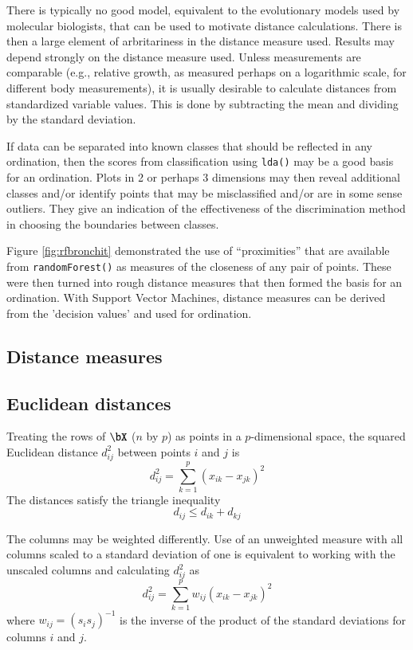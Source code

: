 \documentclass{tufte-book}\usepackage[]{graphicx}\usepackage[]{color}
\newcommand{\txtt}[1]{\texttt{#1}}
\begin{document}
There is typically no good model, equivalent
to the evolutionary models used by molecular biologists, that can be
used to motivate distance calculations.  There is then a large element
of arbritariness in the distance measure used.
Results may depend strongly on the distance measure used.  Unless
measurements are comparable (e.g., relative growth, as measured
perhaps on a logarithmic scale, for different body measurements), it
is usually desirable to calculate distances from standardized variable
values.  This is done by subtracting the mean and dividing by the
standard deviation.

If data can be separated into known classes that should be reflected
in any ordination, then the scores from classification using
\txtt{lda()} may be a good basis for an ordination. Plots in 2 or
perhaps 3 dimensions may then reveal additional classes and/or
identify points that may be misclassified and/or are in some sense
outliers.  They give an indication of the effectiveness of the
discrimination method in choosing the boundaries between classes.

Figure \ref{fig:rfbronchit} demonstrated the use of ``proximities''
that are available from \txtt{randomForest()} as measures of the
closeness of any pair of points.  These were then turned into rough
distance measures that then formed the basis for an ordination.  With
Support Vector Machines, distance measures can be derived from the
'decision values' and used for ordination.

\subsection{Distance measures}

\subsection*{Euclidean distances}

Treating the rows of $\bX$ ($n$ by $p$) as points in a $p$-dimensional
space, the squared Euclidean distance  $d_{ij}^2$ between points $i$ and $j$ is
\[
 d_{ij}^2 = \sum_{k=1}^p (x_{ik}-x_{jk})^2
\]
The distances satisfy the triangle inequality
\[ d_{ij} \le d_{ik} + d_{kj} \]

The columns may be weighted differently.
Use of an unweighted measure with all columns scaled to a standard
deviation of one is equivalent to working with the unscaled columns
and calculating $d_{ij}^2$ as
\[
d_{ij}^2 = \sum_{k=1}^p w_{ij} (x_{ik}-x_{jk})^2
\]
where $w_{ij} = (s_i s_j)^{-1}$ is the inverse of the product of
the standard deviations for columns $i$ and $j$.
\end{document}
